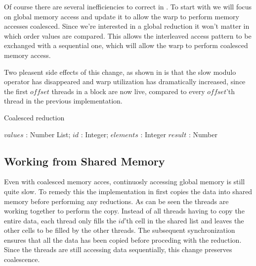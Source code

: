 Of course there are several inefficiencies to correct in
. To start with we will focus on global memory
access and update it to allow the warp to perform memory accesses
coalesced. Since we're interested in a global reduction it won't
matter in which order values are compared. This allows the interleaved
access pattern to be exchanged with a sequential one, which will
allow the warp to perform coalesced memory access.


Two pleasent side effects of this change, as shown in
 is that the slow modulo operator has
disappeared and warp utilization has dramatically increased, since the
first $offset$ threads in a block are now live, compared to every
$offset$'th thread in the previous implementation.

\begin{algorithm}
  \caption{Coalesced reduction}
  \label{alg:coalescedReduct}
  \begin{algorithmic}
              {$values$ : Number List; $id$ : Integer; $elements$ : Integer}
              {$result$ : Number}
              {
                  \ENDIF
                  \SYNC
                \ENDWHILE
                \ENDIF
              }
  \end{algorithmic}
\end{algorithm}



\subsection{Working from Shared Memory}

Even with coalesced memory acces, continuosly accessing global memory
is still quite slow. To remedy this the implementation in
 first copies the data into shared memory
before performing any reductions. As can be seen the threads are
working together to perform the copy. Instead of all threads having to
copy the entire data, each thread only fills the $id$'th cell in the
shared list and leaves the other cells to be filled by the other
threads. The subsequent synchronization ensures that all the data has
been copied before proceding with the reduction. Since the threads are
still accessing data sequentially, this change preserves coalescence.


